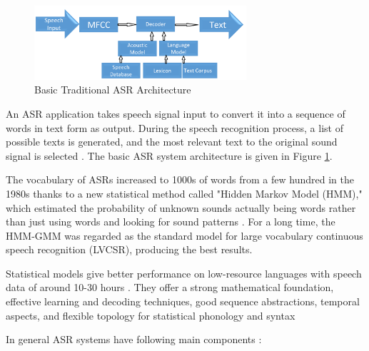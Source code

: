 \begin{figure}
    \centering
    \includegraphics[width=0.7\textwidth]{img/traditional.png}
    \caption{Basic Traditional ASR Architecture}
    \label{fig:asr-diag-arch}
\end{figure}


An ASR application takes speech signal input to convert it into a sequence of words in text form as output. During the speech recognition process, a list of possible texts is generated, and the most relevant text to the original sound signal is selected \cite{davis_automatic_1952}. The basic ASR system architecture is given in Figure \ref{fig:asr-diag-arch}.

The vocabulary of ASRs increased to 1000s of words from a few hundred in the 1980s thanks to a new statistical method called "Hidden Markov Model (HMM)," which estimated the probability of unknown sounds actually being words rather than just using words and looking for sound patterns \cite{suma_swamy_evolution_2013}. For a long time, the HMM-GMM was regarded as the standard model for large vocabulary continuous speech recognition (LVCSR), producing the best results.

Statistical models give better performance on low-resource languages with speech data of around 10-30 hours \cite{naeem_subspace_2020}. They offer a strong mathematical foundation, effective learning and decoding techniques, good sequence abstractions, temporal aspects, and flexible topology for statistical phonology and syntax \cite{morgan_continuous_1995} %

In general ASR systems have following main components \cite{maglogiannis__2020}:

